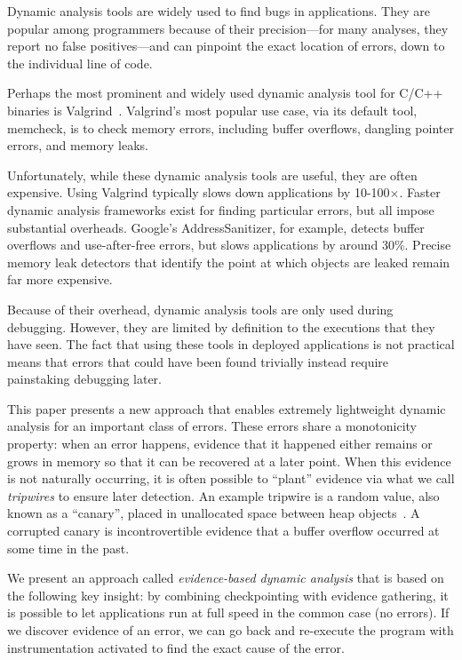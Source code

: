
Dynamic analysis tools are widely used to find bugs in
applications. They are popular among programmers because of their
precision---for many analyses, they report no false positives---and
can pinpoint the exact location of errors, down to the individual line
of code.

Perhaps the most prominent and widely used dynamic analysis tool for
C/C++ binaries is Valgrind~\cite{overflow:valgrind}. Valgrind's most
popular use case, via its default tool, memcheck, is to check memory
errors, including buffer overflows, dangling pointer errors, and
memory leaks.

Unfortunately, while these dynamic analysis tools are useful, they are
often expensive. Using Valgrind typically slows down applications by
10-100$\times$. Faster dynamic analysis frameworks exist for finding
particular errors, but all impose substantial overheads. Google's
AddressSanitizer, for example, detects buffer overflows and
use-after-free errors, but slows applications by around 30\%. Precise
memory leak detectors that identify the point at which objects are
leaked remain far more expensive.

Because of their overhead, dynamic analysis tools are only used during
debugging. However, they are limited by definition to the executions
that they have seen. The fact that using these tools in deployed
applications is not practical means that errors that could
have been found trivially instead require painstaking debugging
later.

This paper presents a new approach that enables extremely lightweight
dynamic analysis for an important class of errors. These errors share
a monotonicity property: when an error happens, evidence that it
happened either remains or grows in memory so that it can be recovered at a
later point. When this evidence is not naturally occurring, it is
often possible to ``plant'' evidence via what we call \emph{tripwires}
to ensure later detection. An example tripwire is a random value, also
known as a ``canary'', placed in unallocated space between heap
objects~\cite{StackGuard}. A corrupted canary is incontrovertible 
evidence that a buffer overflow occurred at some time in the past.

We present an approach called \emph{evidence-based dynamic analysis} that is based on the
following key insight: by combining checkpointing with evidence
gathering, it is possible to let applications run at full speed in the
common case (no errors). If we discover evidence of an error, we can
go back and re-execute the program with instrumentation activated to
find the exact cause of the error.

